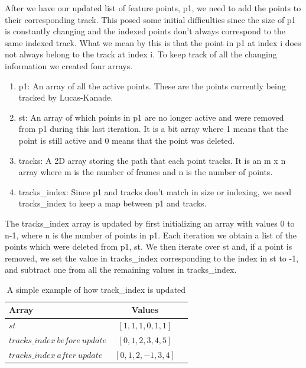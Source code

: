 \documentclass[conference]{IEEEtran}
\begin{document}
After we have our updated list of feature points, p1, we need to add the points to their corresponding track. This posed some initial difficulties since the size of p1 is constantly changing and the indexed points don’t always correspond to the same indexed track. What we mean by this is that the point in p1 at index i does not always belong to the track at index i. To keep track of all the changing information we created four arrays.

\begin{enumerate}
\item p1: An array of all the active points. These are the points currently being tracked by Lucas-Kanade.
\item st: An array of which points in p1 are no longer active and were removed from p1 during this last iteration. It is a bit array where 1 means that the point is still active and 0 means that the point was deleted.
\item tracks: A 2D array storing the path that each point tracks. It is an m x n array where m is the number of frames and n is the number of points.
\item tracks\_index: Since p1 and tracks don’t match in size or indexing, we need tracks\_index to keep a map between p1 and tracks.
\end{enumerate}

The tracks\_index array is updated by first initializing an array with values 0 to n-1, where n is the number of points in p1. Each iteration we obtain a list of the points which were deleted from p1, st. We then iterate over st and, if a point is removed, we set the value in tracks\_index corresponding to the index in st to -1, and subtract one from all the remaining values in tracks\_index.

\begin{table}[!t]
\caption{A simple example of how track\_index is updated}
\label{table_index}
\centering
\begin{tabular}{ | l | c | r | }
 \hline
 Array & Values\\
  \hline\hline                    
  $st$ & $[1, 1, 1, 0, 1, 1]$\\
  \hline
  $tracks\_index\ before\ update$ & $[0, 1, 2, 3, 4, 5]$ \\
  \hline
  $tracks\_index\ after\ update$ & $[0, 1, 2, -1, 3, 4]$ \\
  \hline  
\end{tabular}
\end{table}
\end{document}
